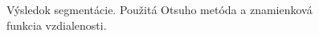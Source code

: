 \documentclass[a4paper,11pt,oneside]{article}%
\begin{document}
\begin{figure}[H]
    \hspace{5px}
    \hspace{5px}
    \caption{Výsledok segmentácie. Použitá Otsuho metóda a znamienková funkcia vzdialenosti.}
    \label{fig:otsu_sdf}
\end{figure}
\end{document}
